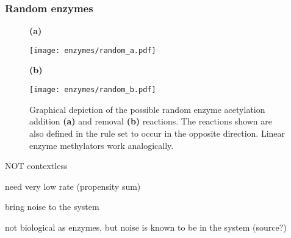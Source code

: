             \subsubsection*{Random enzymes}
                \begin{figure}[htpb!]
                    \centering
                    \begin{minipage}{0.91\textwidth}
                        \begin{minipage}{0.1\textwidth}
                            \caption*{\small \textbf{(a)}}
                        \end{minipage}
                        \begin{minipage}{0.8\textwidth}
                            \texttt{[image: enzymes/random\_a.pdf]}
                        \end{minipage}
                    \end{minipage}
                    \begin{minipage}{0.91\textwidth}
                        \begin{minipage}{0.1\textwidth}
                            \caption*{\small \textbf{(b)}}
                        \end{minipage}
                        \begin{minipage}{0.8\textwidth}
                            \texttt{[image: enzymes/random\_b.pdf]}
                        \end{minipage}
                    \end{minipage}
                    \caption{Graphical depiction of the possible random enzyme acetylation addition \textbf{(a)} and removal \textbf{(b)} reactions. The reactions shown are also defined in the rule set to occur in the opposite direction. Linear enzyme methylators work analogically.}
                    \label{img:randomEnzymes}
                \end{figure}
                \begin{itemize}
                    {
                        \color{red}
                        \item NOT contextless
                        \item need very low rate (propensity sum)
                        \item bring noise to the system
                        \item not biological as enzymes, but noise is known to be in the system (source?)
                    }
                \end{itemize}
